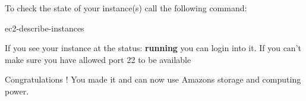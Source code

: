 To check the state of your instance(s) call the following command:

\begin{Command}{10cm}
ec2-describe-instances
\end{Command}

If you see your instance at the status: \textbf{running} you can login
into it. If you can't make sure you have allowed port 22 to be available


Congratulations ! You made it and can now use Amazons storage and
computing power.


